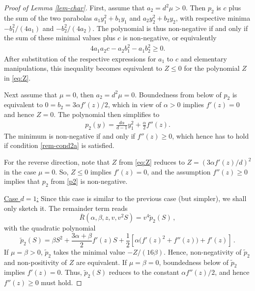 \documentclass[reqno]{amsart}
\begin{document}
\begin{proof}[Proof of Lemma \ref{lem-char}]
First, assume that $a_2=d^2\mu>0$. Then $p_2$ is $c$ plus the sum of the two parabolas $a_1y_1^2+b_1y_1$ and $a_2y_2^2+b_2y_2$, with respective minima $-b_1^2/(4a_1)$ and $-b_2^2/(4a_2)$. The polynomial is thus non-negative if and only if the sum of these minimal values plus $c$ is non-negative, or equivalently
  \begin{align*}
      4a_1a_2c-a_2b_1^2-a_1b_2^2 \ge 0.
  \end{align*}
  After substitution of the respective expressions for $a_1$ to $c$ and elementary manipulations, this inequality becomes equivalent to $Z\le0$ for the polynomial $Z$ in \eqref{eq:Z}. 
  
  Next assume that $\mu=0$, then $a_2=d^2\mu=0$. Boundedness from below of $p_2$ is equivalent to $0=b_2=3\alpha f'(z)/2$, which in view of $\alpha>0$ implies $f'(z)=0$ and hence $Z=0$. The polynomial then simplifies to
  \begin{align}\label{p2}
      p_2(y)=\frac{d\alpha}{d-1}y_1^2+\frac\alpha2f''(z).
  \end{align}
  The minimum is non-negative if and only if $f''(z)\ge0$, which hence has to hold if condition \eqref{rem-cond2a} is satisfied. 
  
  For the reverse direction, note that $Z$ from \eqref{eq:Z} reduces to $Z=(3\alpha f'(z)/d)^2$ in the case $\mu=0$. So, $Z\le0$ implies $f'(z)=0$, and the assumption $f''(z)\ge0$ implies that $p_2$ from \eqref{p2} is non-negative. 

\smallskip
\noindent
\underline{Case $d=1$:} Since this case is similar to the previous case (but simpler), we shall only sketch it. 
The remainder term reads
$$
  \bar R(\alpha, \beta, z, v, v^2S)=v^4 \tilde p_2(S)\,,
$$
with the quadratic polynomial 
$$
  \tilde p_2(S)=\beta S^2 + \frac{3\alpha+\beta}{2}f'(z)S +\frac12 [\alpha\big(f'(z)^2+f''(z)\big)+f'(z)]\,.
$$
If $\mu=\beta>0$, $\tilde p_2$ takes the minimal value $-Z/(16\beta)$. Hence, non-negativity of $\tilde p_2$ and non-positivity of $Z$ are equivalent. If $\mu=\beta=0$, boundedness below of $\tilde p_2$ implies $f'(z)=0$. Thus, $\tilde p_2(S)$ reduces to the constant $\alpha f''(z)/2$, and hence $f''(z)\ge0$ must hold.
\end{proof}
%
\end{document}
